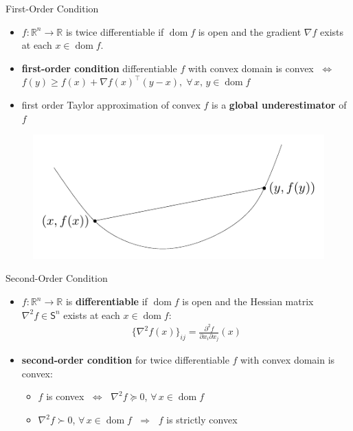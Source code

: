 \documentclass[10pt]{beamer}
\newcommand{\ds}{\displaystyle}
\newcommand{\ie}{\;\Longrightarrow\;}
\newcommand{\ifff}{\;\Longleftrightarrow\;}
\DeclareMathOperator*{\dom}{dom}
\theoremstyle{definition}
\begin{document}
\begin{frame}{First-Order Condition}
  \begin{itemize}
    \item $f:\mathbb{R}^n\to\mathbb{R}$ is twice differentiable if $\dom f$ is open and the gradient $\nabla f$ exists at each $x\in\dom f$.
    \item {\bf first-order condition} differentiable $f$ with convex domain is convex $\ifff$ $\ds f(y) \geqslant f(x) + \nabla f(x)^\top(y - x),\;\forall\,x,\,y\in\dom f$
    \item first order Taylor approximation of convex $f$ is a {\bf global underestimator} of $f$
  \end{itemize}
  \begin{figure}[!htbp]
    \centering
    \includegraphics[scale=1,page=2]{fig/note06/03.pdf}
  \end{figure}
\end{frame}

\begin{frame}{Second-Order Condition}
  \begin{itemize}
    \item $f:\mathbb{R}^n\to\mathbb{R}$ is {\bf differentiable} if $\dom f$ is open and the Hessian matrix $\nabla^2 f\in\mathsf{S}^n$ exists at each $x\in\dom f$: 
      \begin{align*}
        \big\{\nabla^2 f(x)\big\}_{ij} = \frac{\partial^2 f}{\partial x_i\partial x_j}(x)
      \end{align*}
    \item {\bf second-order condition} for twice differentiable $f$ with convex domain is convex: 
      \begin{itemize}
        \item $f$ is convex $\ifff$ $\nabla^2 f\succcurlyeq 0$, $\forall\,x\in\dom f$
        \item $\nabla^2 f\succ 0$, $\forall\,x\in\dom f$ $\ie$ $f$ is strictly convex
      \end{itemize}
  \end{itemize}
\end{frame}
\end{document}

